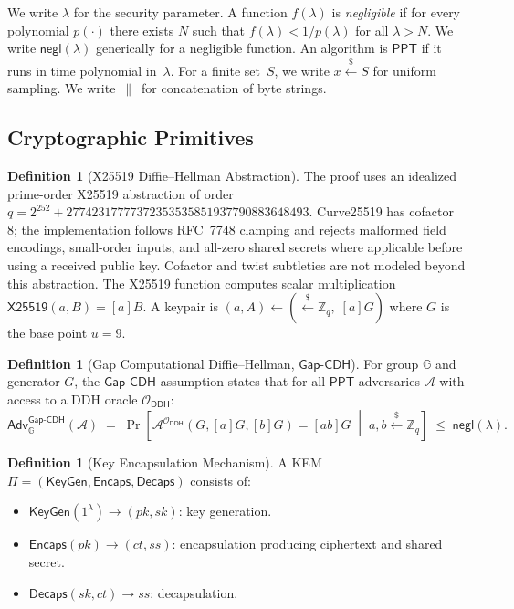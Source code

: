\documentclass[11pt,a4paper]{article}
\theoremstyle{definition}
\newtheorem{definition}[theorem]{Definition}
\theoremstyle{remark}
\newcommand{\secpar}{\lambda}
\newcommand{\negl}{\mathsf{negl}}
\newcommand{\ppt}{\mathsf{PPT}}
\newcommand{\adv}{\mathsf{Adv}}
\newcommand{\advA}{\mathcal{A}}
\newcommand{\oracle}{\mathcal{O}}
\renewcommand{\DH}{\mathsf{X25519}}
\newcommand{\KeyGen}{\mathsf{KeyGen}}
\newcommand{\Encaps}{\mathsf{Encaps}}
\newcommand{\Decaps}{\mathsf{Decaps}}
\newcommand{\GapCDH}{\mathsf{Gap\text{-}CDH}}
\newcommand{\concat}{\,\|\,}
\newcommand{\getsr}{\xleftarrow{\$}}
\begin{document}
We write $\secpar$ for the security parameter. A function
$f(\secpar)$ is \emph{negligible} if for every polynomial $p(\cdot)$ there
exists $N$ such that $f(\secpar) < 1/p(\secpar)$ for all $\secpar > N$.
We write $\negl(\secpar)$ generically for a negligible function.  An
algorithm is $\ppt$ if it runs in time polynomial in~$\secpar$.  For a
finite set~$S$, we write $x \getsr S$ for uniform sampling.  We write
$\concat$ for concatenation of byte strings.

\subsection{Cryptographic Primitives}

\begin{definition}[X25519 Diffie--Hellman Abstraction]
\label{def:dh}
The proof uses an idealized prime-order X25519 abstraction of
order~$q = 2^{252} + 27742317777372353535851937790883648493$.
Curve25519 has cofactor 8; the implementation follows RFC~7748 clamping and
rejects malformed field encodings, small-order inputs, and all-zero shared
secrets where applicable before using a received public key. Cofactor and twist
subtleties are not modeled beyond this abstraction. The X25519 function
computes scalar multiplication $\DH(a, B) = [a]B$. A keypair is
$(a, A) \gets (\getsr \mathbb{Z}_q,\; [a]G)$ where $G$ is the base point
$u = 9$.
\end{definition}

\begin{definition}[Gap Computational Diffie--Hellman, $\GapCDH$]
\label{def:gapcdh}
For group $\mathbb{G}$ and generator $G$, the $\GapCDH$ assumption states that
for all $\ppt$ adversaries $\advA$ with access to a DDH oracle $\oracle_{\mathsf{DDH}}$:
\[
  \adv^{\GapCDH}_{\mathbb{G}}(\advA) \;=\;
  \Pr\!\left[\advA^{\oracle_{\mathsf{DDH}}}(G, [a]G, [b]G) = [ab]G
  \;\middle|\; a,b \getsr \mathbb{Z}_q\right]
  \;\leq\; \negl(\secpar).
\]
\end{definition}

\begin{definition}[Key Encapsulation Mechanism]
\label{def:kem}
A KEM $\Pi = (\KeyGen, \Encaps, \Decaps)$ consists of:
\begin{itemize}[nosep]
  \item $\KeyGen(1^\secpar) \to (\mathit{pk}, \mathit{sk})$: key generation.
  \item $\Encaps(\mathit{pk}) \to (\mathit{ct}, \mathit{ss})$: encapsulation producing ciphertext and shared secret.
  \item $\Decaps(\mathit{sk}, \mathit{ct}) \to \mathit{ss}$: decapsulation.
\end{itemize}
\end{definition}
\end{document}
